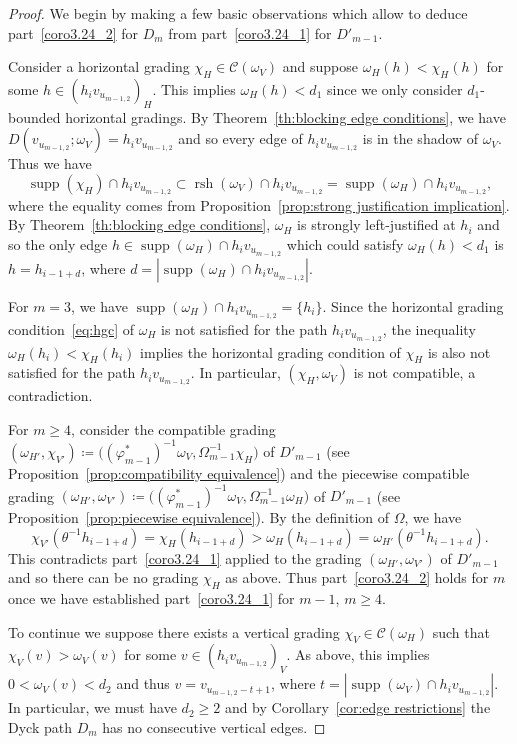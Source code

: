\documentclass[ALCO,ThmDefs,Unicode,epreuves]{cedram}
\newcommand{\cC}{\mathcal{C}}
\DeclareMathOperator{\supp}{supp}
\DeclareMathOperator{\rsh}{rsh}
\begin{document}
\begin{proof}
 We begin by making a few basic observations which allow to deduce part~\ref{coro3.24_2} for $D_m$ from part~\ref{coro3.24_1} for $D'_{m-1}$.
 
 Consider a horizontal grading $\chi_H\in\cC(\omega_V)$ and suppose $\omega_H(h)<\chi_H(h)$ for some $h\in(h_iv_{u_{m-1,2}})_H$.
 This implies $\omega_H(h)<d_1$ since we only consider $d_1$-bounded horizontal gradings.
 By Theorem~\ref{th:blocking edge conditions}, we have $D(v_{u_{m-1,2}};\omega_V)=h_iv_{u_{m-1,2}}$ and so every edge of $h_iv_{u_{m-1,2}}$ is in the shadow of $\omega_V$.
 Thus we have 
 \[\supp(\chi_H)\cap h_iv_{u_{m-1,2}}\subset\rsh(\omega_V)\cap h_iv_{u_{m-1,2}}=\supp(\omega_H)\cap h_iv_{u_{m-1,2}},\]
 where the equality comes from Proposition~\ref{prop:strong justification implication}.
 By Theorem~\ref{th:blocking edge conditions}, $\omega_H$ is strongly left-justified at $h_i$ and so the only edge $h\in\supp(\omega_H)\cap h_iv_{u_{m-1,2}}$ which could satisfy $\omega_H(h)<d_1$ is $h=h_{i-1+d}$, where $d=|\supp(\omega_H)\cap h_iv_{u_{m-1,2}}|$.

 For $m=3$, we have $\supp(\omega_H)\cap h_iv_{u_{m-1,2}}=\{h_i\}$.
 Since the horizontal grading condition~\eqref{eq:hgc} of $\omega_H$ is not satisfied for the path $h_iv_{u_{m-1,2}}$, the inequality $\omega_H(h_i)<\chi_H(h_i)$ implies the horizontal grading condition of $\chi_H$ is also not satisfied for the path $h_iv_{u_{m-1,2}}$.
 In particular, $(\chi_H,\omega_V)$ is not compatible, a contradiction. 
 
 For $m\ge4$, consider the compatible grading $(\omega_{H'},\chi_{V'})\coloneqq \big((\varphi^*_{m-1})^{-1}\omega_V,\Omega_{m-1}^{-1}\chi_H\big)$ of $D'_{m-1}$ (see Proposition~\ref{prop:compatibility equivalence}) and the piecewise compatible grading $(\omega_{H'},\omega_{V'})\coloneqq \big((\varphi^*_{m-1})^{-1}\omega_V,\Omega_{m-1}^{-1}\omega_H\big)$ of $D'_{m-1}$ (see Proposition~\ref{prop:piecewise equivalence}).
 By the definition of $\Omega$, we have
 \[\chi_{V'}(\theta^{-1}h_{i-1+d})=\chi_H(h_{i-1+d})>\omega_H(h_{i-1+d})=\omega_{H'}(\theta^{-1}h_{i-1+d}).\]
 This contradicts part~\ref{coro3.24_1} applied to the grading $(\omega_{H'},\omega_{V'})$ of $D'_{m-1}$ and so there can be no grading $\chi_H$ as above.
 Thus part~\ref{coro3.24_2} holds for $m$ once we have established part~\ref{coro3.24_1} for $m-1$, $m\ge4$.

 To continue we suppose there exists a vertical grading $\chi_V\in\cC(\omega_H)$ such that $\chi_V(v)>\omega_V(v)$ for some $v\in(h_iv_{u_{m-1,2}})_V$.
 As above, this implies $0<\omega_V(v)<d_2$ and thus $v=v_{u_{m-1,2}-t+1}$, where $t=|\supp(\omega_V)\cap h_iv_{u_{m-1,2}}|$.
 In particular, we must have $d_2\ge2$ and by Corollary~\ref{cor:edge restrictions} the Dyck path $D_m$ has no consecutive vertical edges.
 

\end{proof}
\end{document}
